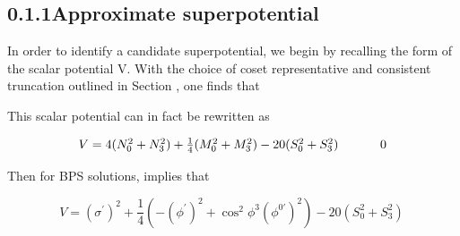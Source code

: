 \documentclass{article}
\begin{document}
\subsection*{0.1.1Approximate superpotential}


In order to identify a candidate superpotential, we begin by recalling the form of the scalar
potential V. With the choice of coset representative and consistent truncation outlined in
Section , one finds that


This scalar potential can in fact be rewritten as


\begin{equation}
\begin{array}{c c c}{{V=4(N_{0}^{2}+N_{3}^{2})+\frac{1}{4}(M_{0}^{2}+M_{3}^{2})-20(S_{0}^{2}+S_{3}^{2})}}&{{~~~}}&{{~ 0}}\end{array}
\end{equation}


Then for BPS solutions, implies that


\begin{equation}
V=(\sigma^{\prime})^{2}+\frac{1}{4}\left(-(\phi^{\prime})^{2}+\cos^{2}\phi^{3}(\phi^{0\prime})^{2}\right)-20(S_{0}^{2}+S_{3}^{2})~
\end{equation}
\end{document}
